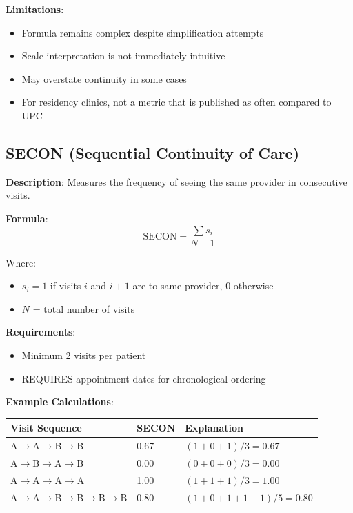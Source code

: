 \documentclass[11pt,a4paper]{article}
\newcommand{\secon}{\text{SECON}}
\begin{document}
\textbf{Limitations}:
\begin{itemize}
\item Formula remains complex despite simplification attempts
\item Scale interpretation is not immediately intuitive
\item May overstate continuity in some cases
\item For residency clinics, not a metric that is published as often compared to UPC
\end{itemize}

\subsection{SECON (Sequential Continuity of Care)}

\textbf{Description}: Measures the frequency of seeing the same provider in consecutive visits.

\textbf{Formula}:
\begin{equation}
\secon = \frac{\sum s_i}{N-1}
\end{equation}

Where:
\begin{itemize}
\item $s_i = 1$ if visits $i$ and $i+1$ are to same provider, 0 otherwise
\item $N$ = total number of visits
\end{itemize}

\textbf{Requirements}:
\begin{itemize}
\item Minimum 2 visits per patient
\item REQUIRES appointment dates for chronological ordering
\end{itemize}

\textbf{Example Calculations}:
\begin{table}[h]
\centering
\begin{tabular}{lll}
\toprule
Visit Sequence & SECON & Explanation \\
\midrule
A$\rightarrow$A$\rightarrow$B$\rightarrow$B & 0.67 & $(1+0+1)/3 = 0.67$ \\
A$\rightarrow$B$\rightarrow$A$\rightarrow$B & 0.00 & $(0+0+0)/3 = 0.00$ \\
A$\rightarrow$A$\rightarrow$A$\rightarrow$A & 1.00 & $(1+1+1)/3 = 1.00$ \\
A$\rightarrow$A$\rightarrow$B$\rightarrow$B$\rightarrow$B$\rightarrow$B & 0.80 & $(1+0+1+1+1)/5 = 0.80$ \\
\bottomrule
\end{tabular}
\end{table}
\end{document}
